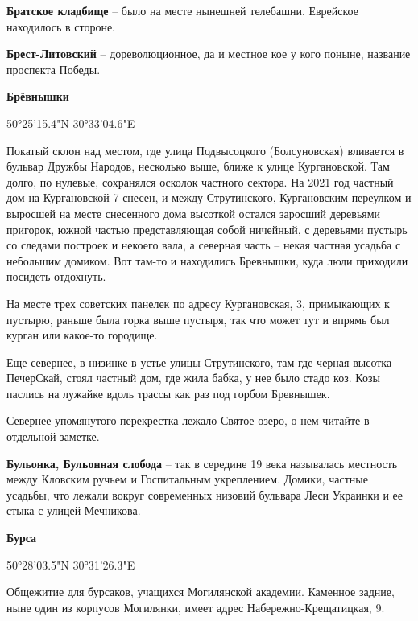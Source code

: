 \medskip

\textbf{Братское кладбище} – было на месте нынешней телебашни. Еврейское находилось в стороне.\\

\medskip

\textbf{Брест-Литовский} – дореволюционное, да и местное кое у кого поныне, название проспекта Победы.\\

\medskip

\textbf{Брёвнышки}

50°25'15.4"N 30°33'04.6"E

Покатый склон над местом, где улица Подвысоцкого (Болсуновская) вливается в бульвар Дружбы Народов, несколько выше, ближе к улице Кургановской. Там долго, по нулевые, сохранялся осколок частного сектора. На 2021 год частный дом на Кургановской 7 снесен, и между Струтинского, Кургановским переулком и выросшей на месте снесенного дома высоткой остался заросший деревьями пригорок, южной частью представляющая собой ничейный, с деревьями пустырь со следами построек и некоего вала, а северная часть – некая частная усадьба с небольшим домиком. Вот там-то и находились Бревнышки, куда люди приходили посидеть-отдохнуть.

На месте трех советских панелек по адресу Кургановская, 3, примыкающих к пустырю, раньше была горка выше пустыря, так что может тут и впрямь был курган или какое-то городище.

Еще севернее, в низинке в устье улицы Струтинского, там где черная высотка ПечерСкай, стоял частный дом, где жила бабка, у нее было стадо коз. Козы паслись на лужайке вдоль трассы как раз под горбом Бревнышек.

Севернее упомянутого перекрестка лежало Святое озеро, о нем читайте в отдельной заметке.\\

\medskip


\textbf{Бульонка, Бульонная слобода} – так в середине 19 века называлась местность между Кловским ручьем и Госпитальным укреплением. Домики, частные усадьбы, что лежали вокруг современных низовий бульвара Леси Украинки и ее стыка с улицей Мечникова.\\

\medskip

\textbf{Бурса} 

50°28'03.5"N 30°31'26.3"E

Общежитие для бурсаков, учащихся Могилянской академии. Каменное задние, ныне один из корпусов Могилянки, имеет адрес Набережно-Крещатицкая, 9. 

